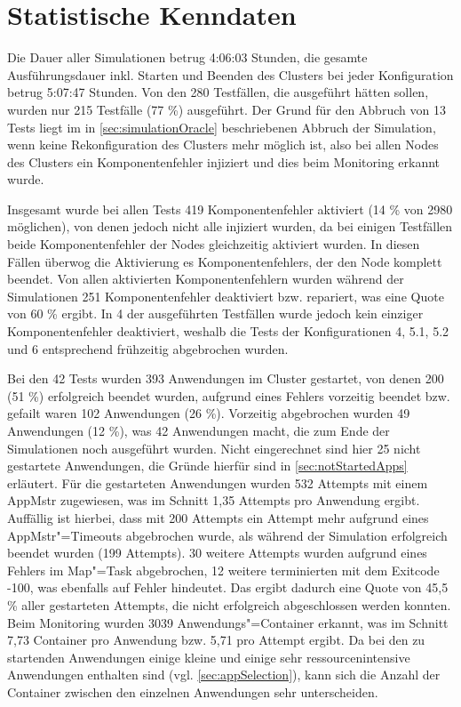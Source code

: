 \section{Statistische Kenndaten}
\label{sec:evaluationStats}

Die Dauer aller Simulationen betrug 4:06:03 Stunden, die gesamte Ausführungsdauer inkl. Starten und Beenden des Clusters bei jeder Konfiguration betrug 5:07:47 Stunden.
Von den 280 Testfällen, die ausgeführt hätten sollen, wurden nur 215 Testfälle (77 \%) ausgeführt.
Der Grund für den Abbruch von 13 Tests liegt im in \autoref{sec:simulationOracle} beschriebenen Abbruch der Simulation, wenn keine Rekonfiguration des Clusters mehr möglich ist, also bei allen Nodes des Clusters ein Komponentenfehler injiziert und dies beim Monitoring erkannt wurde.

Insgesamt wurde bei allen Tests 419 Komponentenfehler aktiviert (14 \% von 2980 möglichen), von denen jedoch nicht alle injiziert wurden, da bei einigen Testfällen beide Komponentenfehler der Nodes gleichzeitig aktiviert wurden.
In diesen Fällen überwog die Aktivierung es Komponentenfehlers, der den Node komplett beendet.
Von allen aktivierten Komponentenfehlern wurden während der Simulationen 251 Komponentenfehler deaktiviert bzw. repariert, was eine Quote von 60 \% ergibt.
In 4 der ausgeführten Testfällen wurde jedoch kein einziger Komponentenfehler deaktiviert, weshalb die Tests der Konfigurationen 4, 5.1, 5.2 und 6 entsprechend frühzeitig abgebrochen wurden.

Bei den 42 Tests wurden 393 Anwendungen im Cluster gestartet, von denen 200 (51 \%) erfolgreich beendet wurden, aufgrund eines Fehlers vorzeitig beendet bzw. gefailt waren 102 Anwendungen (26 \%).
Vorzeitig abgebrochen wurden 49 Anwendungen (12 \%), was 42 Anwendungen macht, die zum Ende der Simulationen noch ausgeführt wurden.
Nicht eingerechnet sind hier 25 nicht gestartete Anwendungen, die Gründe hierfür sind in \autoref{sec:notStartedApps} erläutert.
Für die gestarteten Anwendungen wurden 532 Attempts mit einem \ac{AppMstr} zugewiesen, was im Schnitt 1,35 Attempts pro Anwendung ergibt.
Auffällig ist hierbei, dass mit 200 Attempts ein Attempt mehr aufgrund eines \ac{AppMstr}"=Timeouts abgebrochen wurde, als während der Simulation erfolgreich beendet wurden (199 Attempts).
30 weitere Attempts wurden aufgrund eines Fehlers im Map"=Task abgebrochen, 12 weitere terminierten mit dem Exitcode -100, was ebenfalls auf Fehler hindeutet.
Das ergibt dadurch eine Quote von 45,5 \% aller gestarteten Attempts, die nicht erfolgreich abgeschlossen werden konnten.
Beim Monitoring wurden 3039 Anwendungs"=Container erkannt, was im Schnitt 7,73 Container pro Anwendung bzw. 5,71 pro Attempt ergibt.
Da bei den zu startenden Anwendungen einige kleine und einige sehr ressourcenintensive Anwendungen enthalten sind (vgl. \autoref{sec:appSelection}), kann sich die Anzahl der Container zwischen den einzelnen Anwendungen sehr unterscheiden.

